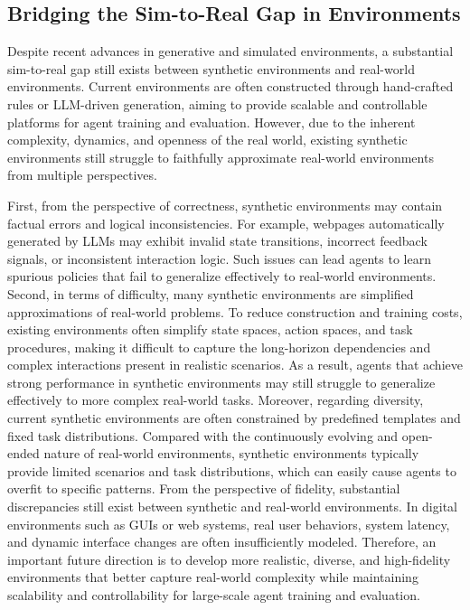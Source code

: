 \subsection{Bridging the Sim-to-Real Gap in Environments}

Despite recent advances in generative and simulated environments, a substantial sim-to-real gap still exists between synthetic environments and real-world environments. 
Current environments are often constructed through hand-crafted rules or LLM-driven generation, aiming to provide scalable and controllable platforms for agent training and evaluation.
However, due to the inherent complexity, dynamics, and openness of the real world, existing synthetic environments still struggle to faithfully approximate real-world environments from multiple perspectives.

First, from the perspective of correctness, synthetic environments may contain factual errors and logical inconsistencies.
For example, webpages automatically generated by LLMs may exhibit invalid state transitions, incorrect feedback signals, or inconsistent interaction logic.
Such issues can lead agents to learn spurious policies that fail to generalize effectively to real-world environments.
Second, in terms of difficulty, many synthetic environments are simplified approximations of real-world problems.
To reduce construction and training costs, existing environments often simplify state spaces, action spaces, and task procedures, making it difficult to capture the long-horizon dependencies and complex interactions present in realistic scenarios.
As a result, agents that achieve strong performance in synthetic environments may still struggle to generalize effectively to more complex real-world tasks.
Moreover, regarding diversity, current synthetic environments are often constrained by predefined templates and fixed task distributions.
Compared with the continuously evolving and open-ended nature of real-world environments, synthetic environments typically provide limited scenarios and task distributions, which can easily cause agents to overfit to specific patterns.
From the perspective of fidelity, substantial discrepancies still exist between synthetic and real-world environments. 
In digital environments such as GUIs or web systems, real user behaviors, system latency, and dynamic interface changes are often insufficiently modeled. 
Therefore, an important future direction is to develop more realistic, diverse, and high-fidelity environments that better capture real-world complexity while maintaining scalability and controllability for large-scale agent training and evaluation.

